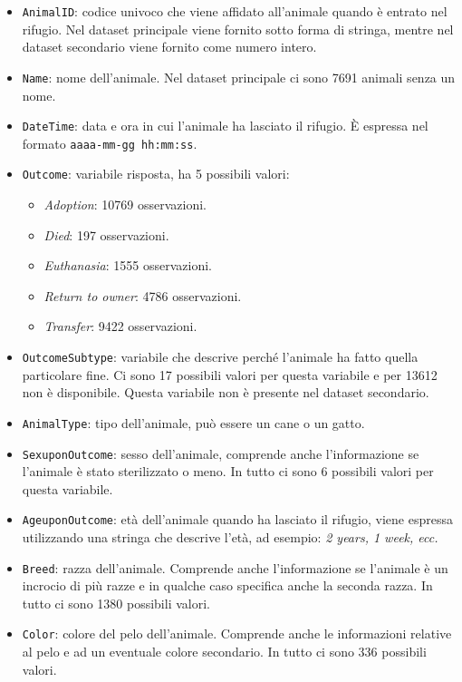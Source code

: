 \begin{itemize}
	\item \texttt{AnimalID}: codice univoco che viene affidato all'animale quando è entrato nel rifugio. Nel dataset principale viene fornito sotto forma di stringa, mentre nel dataset secondario viene fornito come numero intero.
	\item \texttt{Name}: nome dell'animale. Nel dataset principale ci sono 7691 animali senza un nome.
	\item \texttt{DateTime}: data e ora in cui l'animale ha lasciato il rifugio. \`{E} espressa nel formato \texttt{aaaa-mm-gg hh:mm:ss}.
	\item \texttt{Outcome}: variabile risposta, ha 5 possibili valori:
		\begin{itemize}
			\item \textit{Adoption}: 10769 osservazioni.
			\item \textit{Died}: 197 osservazioni.
			\item \textit{Euthanasia}: 1555 osservazioni.
			\item \textit{Return to owner}: 4786 osservazioni.
			\item \textit{Transfer}: 9422 osservazioni.
		\end{itemize}
	\item \texttt{OutcomeSubtype}: variabile che descrive perché l'animale ha fatto quella particolare fine. Ci sono 17 possibili valori per questa variabile e per 13612 non è disponibile. Questa variabile non è presente nel dataset secondario.
	\item \texttt{AnimalType}: tipo dell'animale, può essere un cane o un gatto.
	\item \texttt{SexuponOutcome}: sesso dell'animale, comprende anche l'informazione se l'animale è stato sterilizzato o meno. In tutto ci sono 6 possibili valori per questa variabile.
	\item \texttt{AgeuponOutcome}: età dell'animale quando ha lasciato il rifugio, viene espressa utilizzando una stringa che descrive l'età, ad esempio: \textit{2 years, 1 week, ecc.}
	\item \texttt{Breed}: razza dell'animale. Comprende anche l'informazione se l'animale è un incrocio di più razze e in qualche caso specifica anche la seconda razza. In tutto ci sono 1380 possibili valori.
	\item \texttt{Color}: colore del pelo dell'animale. Comprende anche le informazioni relative al pelo e ad un eventuale colore secondario. In tutto ci sono 336 possibili valori.
\end{itemize}

